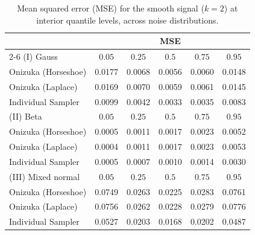 \begin{table}[htbp]
\centering
\caption{Mean squared error (MSE) for the smooth signal ($k=2$) at interior quantile levels, across noise distributions.}
\label{tab:s_int_mse}
\begin{tabular}{lccccc}
\toprule
& \multicolumn{5}{c}{MSE} \\
\cmidrule(lr){2-6}
(I) Gauss & $0.05$ & $0.25$ & $0.5$ & $0.75$ & $0.95$ \\
\midrule
Onizuka (Horseshoe) & 0.0177 & 0.0068 & 0.0056 & 0.0060 & 0.0148 \\
Onizuka (Laplace)   & 0.0169 & 0.0070 & 0.0059 & 0.0061 & 0.0145 \\
Individual Sampler  & 0.0099 & 0.0042 & 0.0033 & 0.0035 & 0.0083 \\
\midrule
(II) Beta & $0.05$ & $0.25$ & $0.5$ & $0.75$ & $0.95$ \\
\midrule
Onizuka (Horseshoe) & 0.0005 & 0.0011 & 0.0017 & 0.0023 & 0.0052 \\
Onizuka (Laplace)   & 0.0004 & 0.0011 & 0.0017 & 0.0023 & 0.0053 \\
Individual Sampler  & 0.0005 & 0.0007 & 0.0010 & 0.0014 & 0.0030 \\
\midrule
(III) Mixed normal & $0.05$ & $0.25$ & $0.5$ & $0.75$ & $0.95$ \\
\midrule
Onizuka (Horseshoe) & 0.0749 & 0.0263 & 0.0225 & 0.0283 & 0.0761 \\
Onizuka (Laplace)   & 0.0756 & 0.0262 & 0.0228 & 0.0279 & 0.0776 \\
Individual Sampler  & 0.0527 & 0.0203 & 0.0168 & 0.0202 & 0.0487 \\
\bottomrule
\end{tabular}
\end{table}

